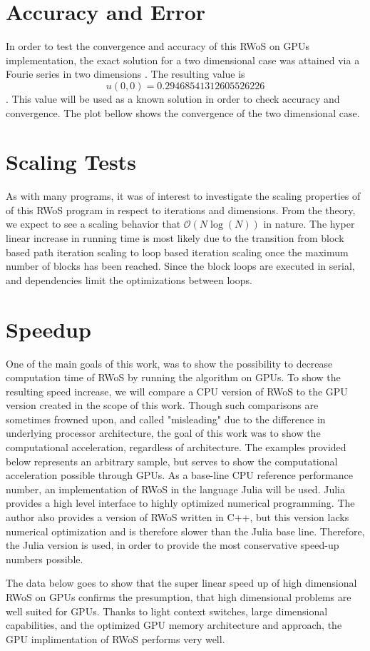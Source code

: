 \section{Accuracy and Error}
In order to test the convergence and accuracy of this \Gls{RWoS} on \Glspl{GPU} implementation,
the exact solution for a two dimensional case was attained via a Fourie series in
two dimensions \cite{Bornemann}.  The resulting value is  $$u(0,0) = 0.29468 54131 26055 26226$$.
This value will be used as a known solution in order to check accuracy and convergence.
The plot bellow shows the convergence of the two dimensional case.


\section{Scaling Tests}
As with many programs, it was of interest to investigate the scaling properties of
of this \Gls{RWoS} program in respect to iterations and dimensions. From the theory,
we expect to see a scaling behavior that $\mathcal{O}( N\log(N))$ in nature.
The hyper linear increase in running time is most likely due to the transition from
block based path iteration scaling to loop based iteration scaling once the maximum
number of blocks has been reached.  Since the block loops are executed in serial,
and dependencies limit the optimizations between loops.
\section{Speedup}
One of the main goals of this work, was to show the possibility to decrease computation
time of \Gls{RWoS} by running the algorithm on \Glspl{GPU}.  To show the resulting
speed increase, we will compare a CPU version of \Gls{RWoS} to the \Gls{GPU} version
created in the scope of this work.  Though such comparisons are sometimes frowned
upon, and called "misleading" due to the difference in underlying processor architecture,
the goal of this work was to show the computational acceleration, regardless of architecture.
The examples provided below represents an arbitrary sample, but serves to show the
computational acceleration possible through \Glspl{GPU}.  As a base-line \Gls{CPU}
reference performance number, an implementation of \Gls{RWoS} in the language
Julia will be used.  Julia provides a high level interface to highly optimized
numerical programming.  The author also provides a version of \Gls{RWoS} written
in C++, but this version lacks numerical optimization and is therefore slower than
the Julia base line.  Therefore, the Julia version is used, in order to provide
the most conservative \Gls{speed-up} numbers possible.
\par
The data below goes to show that the super linear speed up of high dimensional
\Gls{RWoS} on \Glspl{GPU} confirms the presumption, that high dimensional problems
are well suited for \Glspl{GPU}.  Thanks to light context switches, large dimensional capabilities,
and the optimized \Gls{GPU} memory architecture and approach, the \Gls{GPU} implimentation
of \Gls{RWoS} performs very well.
